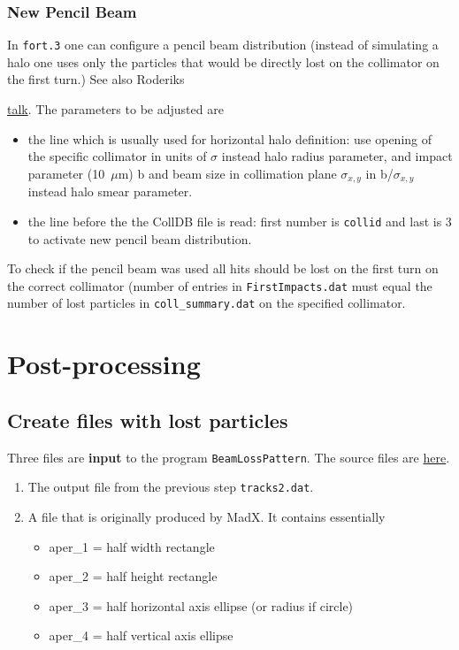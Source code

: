 \documentclass[a4paper, oneside, final]{scrartcl}
\begin{document}
{{\subsubsection{New Pencil Beam}
In \texttt{fort.3} one can configure a pencil beam distribution (instead of simulating a halo one uses only the particles that would be directly lost on the collimator on the first turn.) See also Roderiks {\href{https://indico.cern.ch/event/276974/}{talk}. The parameters to be adjusted are 

\begin{itemize}
\item the line which is usually used for horizontal halo definition: use opening of the specific collimator in units of $\sigma$ instead halo radius parameter, and impact parameter (10~$\mu$m) b and beam size in collimation plane $\sigma_{x,y}$ in b/$\sigma_{x,y}$ instead halo smear parameter.
\item the line before the the CollDB file is read: first number is \texttt{collid} and last is $3$ to activate new pencil beam distribution.
\end{itemize}

To check if the pencil beam was used all hits should be lost on the first turn on the correct collimator (number of entries in \texttt{FirstImpacts.dat} must equal the number of lost particles in \texttt{coll\_summary.dat} on the specified collimator.

\section{Post-processing}

\subsection{Create files with lost particles}

Three files are \textbf{input} to the program \texttt{BeamLossPattern}. The source files are {\href{http://lhc-collimation-project.web.cern.ch/lhc-collimation-project/BeamLossPattern.htm}{here}}.

\begin{enumerate}
\item The output file from the previous step \texttt{tracks2.dat}. 
\item A file that is originally produced by MadX. It contains essentially 

\begin{itemize}
\item aper\_1 = half width rectangle
\item aper\_2 = half height rectangle
\item aper\_3 = half horizontal axis ellipse (or radius if circle)
\item aper\_4 = half vertical axis ellipse
\end{itemize}


\end{enumerate}}}}
\end{document}
